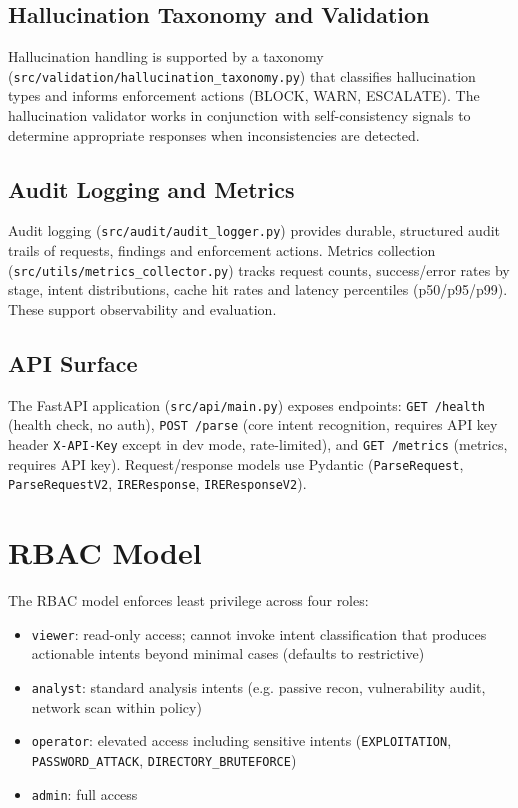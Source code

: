 \subsection{Hallucination Taxonomy and Validation}

Hallucination handling is supported by a taxonomy (\texttt{src/validation/hallucination\_taxonomy.py}) that classifies hallucination types and informs enforcement actions (BLOCK, WARN, ESCALATE). The hallucination validator works in conjunction with self-consistency signals to determine appropriate responses when inconsistencies are detected.

\subsection{Audit Logging and Metrics}

Audit logging (\texttt{src/audit/audit\_logger.py}) provides durable, structured audit trails of requests, findings and enforcement actions. Metrics collection (\texttt{src/utils/metrics\_collector.py}) tracks request counts, success/error rates by stage, intent distributions, cache hit rates and latency percentiles (p50/p95/p99). These support observability and evaluation.

\subsection{API Surface}

The FastAPI application (\texttt{src/api/main.py}) exposes endpoints: \texttt{GET /health} (health check, no auth), \texttt{POST /parse} (core intent recognition, requires API key header \texttt{X-API-Key} except in dev mode, rate-limited), and \texttt{GET /metrics} (metrics, requires API key). Request/response models use Pydantic (\texttt{ParseRequest}, \texttt{ParseRequestV2}, \texttt{IREResponse}, \texttt{IREResponseV2}).

\section{RBAC Model}\label{sec:method-rbac}

The RBAC model enforces least privilege across four roles:
\begin{itemize}
  \item \texttt{viewer}: read-only access; cannot invoke intent classification that produces actionable intents beyond minimal cases (defaults to restrictive)
  \item \texttt{analyst}: standard analysis intents (e.g. passive recon, vulnerability audit, network scan within policy)
  \item \texttt{operator}: elevated access including sensitive intents (\texttt{EXPLOITATION}, \texttt{PASSWORD\_ATTACK}, \texttt{DIRECTORY\_BRUTEFORCE})
  \item \texttt{admin}: full access
\end{itemize}


